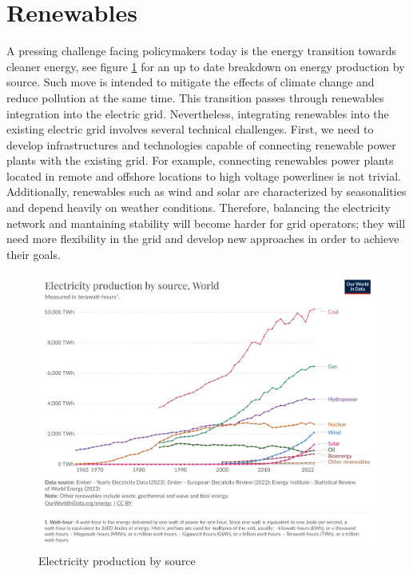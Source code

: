 \section{Renewables}
A pressing challenge facing policymakers today is the energy transition towards cleaner energy, see figure \ref{fig:electricity_production_by_source} for an up to date breakdown on energy production by source. Such move is intended to mitigate the effects of climate change and reduce pollution at the same time.
This transition passes through renewables integration into the electric grid. 
Nevertheless, integrating renewables into the existing electric grid involves several technical challenges. First, we need to develop infrastructures and technologies capable of connecting renewable power plants with the existing grid. For example, connecting renewables power plants located in remote and offshore locations to high voltage powerlines is not trivial.
Additionally, renewables such as wind and solar are characterized by seasonalities and depend heavily on weather conditions. Therefore, balancing the electricity network and mantaining stability will become harder for grid operators; they will need more flexibility in the grid and develop new approaches in order to achieve their goals.

\begin{figure}[!h]
    \includegraphics[width=\textwidth]{images/electricity-production-by-source.png}
    \caption{Electricity production by source \cite{energy2023statistical}}    
    \label{fig:electricity_production_by_source}
\end{figure}

